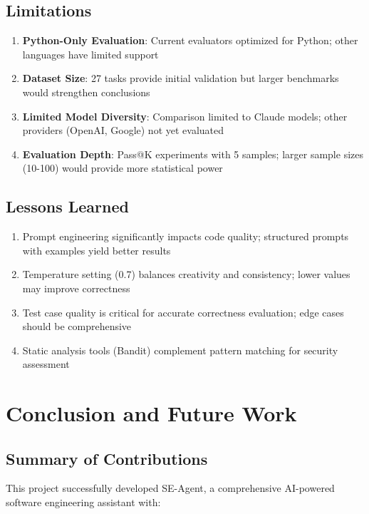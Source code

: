 \documentclass[12pt,a4paper]{article}
\begin{document}
\subsection{Limitations}

\begin{enumerate}
    \item \textbf{Python-Only Evaluation}: Current evaluators optimized for Python; other languages have limited support
    \item \textbf{Dataset Size}: 27 tasks provide initial validation but larger benchmarks would strengthen conclusions
    \item \textbf{Limited Model Diversity}: Comparison limited to Claude models; other providers (OpenAI, Google) not yet evaluated
    \item \textbf{Evaluation Depth}: Pass@K experiments with 5 samples; larger sample sizes (10-100) would provide more statistical power
\end{enumerate}

\subsection{Lessons Learned}

\begin{enumerate}
    \item Prompt engineering significantly impacts code quality; structured prompts with examples yield better results
    \item Temperature setting (0.7) balances creativity and consistency; lower values may improve correctness
    \item Test case quality is critical for accurate correctness evaluation; edge cases should be comprehensive
    \item Static analysis tools (Bandit) complement pattern matching for security assessment
\end{enumerate}

\section{Conclusion and Future Work}

\subsection{Summary of Contributions}

This project successfully developed SE-Agent, a comprehensive AI-powered software engineering assistant with:
\end{document}
